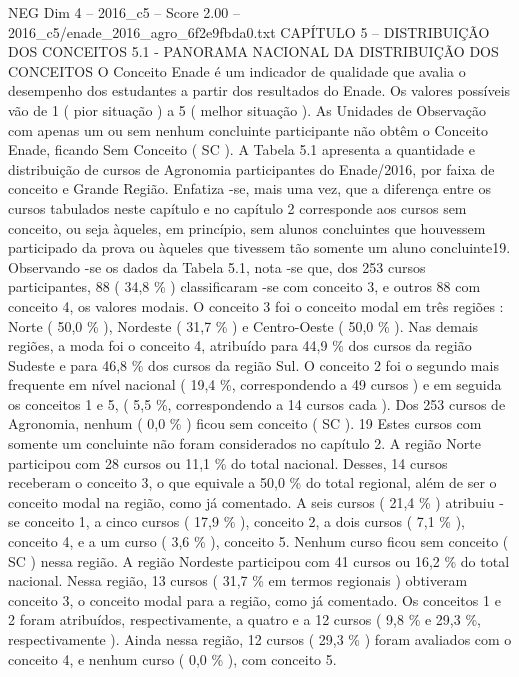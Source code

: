\begin{textsample}{NEG Dim 4 – 2016\_c5 – Score 2.00 – 2016\_c5/enade\_2016\_agro\_6f2e9fbda0.txt}  \label{ex:f4_neg_254}
CAPÍTULO 5 – DISTRIBUIÇÃO DOS CONCEITOS 5.1 - PANORAMA NACIONAL DA DISTRIBUIÇÃO DOS CONCEITOS O Conceito Enade é um indicador de qualidade que avalia o desempenho dos estudantes a partir dos resultados do Enade.
Os valores possíveis vão de 1 ( pior situação ) a 5 ( melhor situação ).
As Unidades de Observação com apenas um ou sem nenhum concluinte participante não obtêm o Conceito Enade, ficando Sem Conceito ( SC ).
A Tabela 5.1 apresenta a quantidade e distribuição de cursos de Agronomia participantes do Enade/2016, por faixa de conceito e Grande Região.
Enfatiza -se, mais uma vez, que a diferença entre os cursos tabulados neste capítulo e no capítulo 2 corresponde aos cursos sem conceito, ou seja àqueles, em princípio, sem alunos concluintes que houvessem participado da prova ou àqueles que tivessem tão somente um aluno concluinte19.
Observando -se os dados da Tabela 5.1, nota -se que, dos 253 cursos participantes, 88 ( 34,8 \% ) classificaram -se com conceito 3, e outros 88 com conceito 4, os valores modais.
O conceito 3 foi o conceito modal em três regiões : Norte ( 50,0 \% ), Nordeste ( 31,7 \% ) e Centro-Oeste ( 50,0 \% ).
Nas demais regiões, a moda foi o conceito 4, atribuído para 44,9 \% dos cursos da região Sudeste e para 46,8 \% dos cursos da região Sul.
O conceito 2 foi o segundo mais frequente em nível nacional ( 19,4 \%, correspondendo a 49 cursos ) e em seguida os conceitos 1 e 5, ( 5,5 \%, correspondendo a 14 cursos cada ).
Dos 253 cursos de Agronomia, nenhum ( 0,0 \% ) ficou sem conceito ( SC ). 19 Estes cursos com somente um concluinte não foram considerados no capítulo 2.
A região Norte participou com 28 cursos ou 11,1 \% do total nacional.
Desses, 14 cursos receberam o conceito 3, o que equivale a 50,0 \% do total regional, além de ser o conceito modal na região, como já comentado.
A seis cursos ( 21,4 \% ) atribuiu -se conceito 1, a cinco cursos ( 17,9 \% ), conceito 2, a dois cursos ( 7,1 \% ), conceito 4, e a um curso ( 3,6 \% ), conceito 5.
Nenhum curso ficou sem conceito ( SC ) nessa região.
A região Nordeste participou com 41 cursos ou 16,2 \% do total nacional.
Nessa região, 13 cursos ( 31,7 \% em termos regionais ) obtiveram conceito 3, o conceito modal para a região, como já comentado.
Os conceitos 1 e 2 foram atribuídos, respectivamente, a quatro e a 12 cursos ( 9,8 \% e 29,3 \%, respectivamente ).
Ainda nessa região, 12 cursos ( 29,3 \% ) foram avaliados com o conceito 4, e nenhum curso ( 0,0 \% ), com conceito 5.

\end{textsample}
